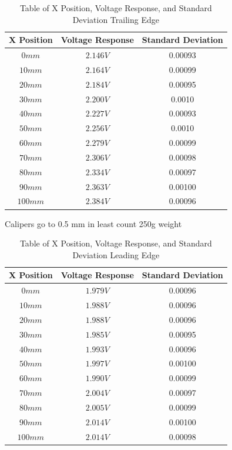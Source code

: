 \documentclass{article}
\begin{document}
\begin{table}[ht]
\centering
\begin{tabular}{|c|c|c|}
\hline
\textbf{X Position} & \textbf{Voltage Response} & \textbf{Standard Deviation} \\
\hline
$0 mm$ & $2.146 V$ & 0.00093 \\
\hline
$10 mm$ & $2.164 V$ & 0.00099\\
\hline
$20 mm$ & $2.184 V$ & 0.00095\\
\hline
$30 mm$ & $2.200 V$ & 0.0010 \\
\hline
$40 mm$ & $2.227 V$ & 0.00093 \\
\hline
$50 mm$ & $2.256 V$ & 0.0010 \\
\hline
$60 mm$ & $2.279 V$ & 0.00099 \\
\hline
$70 mm$ & $2.306 V$ & 0.00098 \\
\hline
$80 mm$ & $2.334 V$ & 0.00097\\
\hline
$90 mm$ & $2.363 V$ & 0.00100\\
\hline
$100 mm$ & $2.384 V$ & 0.00096\\
\hline
\end{tabular}
\caption{Table of X Position, Voltage Response, and Standard Deviation Trailing Edge}
\label{tab:position_voltage_stddev}
\end{table}

Calipers go to 0.5 mm in least count
250g weight



\begin{table}[ht]
\centering
\begin{tabular}{|c|c|c|}
\hline
\textbf{X Position} & \textbf{Voltage Response} & \textbf{Standard Deviation} \\
\hline
$0 mm$ & $1.979 V$ & 0.00096\\
\hline
$10 mm$ & $1.988 V$ & 0.00096 \\
\hline
$20 mm$ & $1.988 V$ & 0.00096 \\
\hline
$30 mm$ & $1.985 V$ & 0.00095 \\
\hline
$40 mm$ & $1.993 V$ & 0.00096 \\
\hline
$50 mm$ & $1.997 V$ & 0.00100 \\
\hline
$60 mm$ & $1.990 V$ & 0.00099 \\
\hline
$70 mm$ & $2.004 V$ & 0.00097 \\
\hline
$80 mm$ & $2.005 V$ & 0.00099 \\
\hline
$90 mm$ & $2.014 V$ & 0.00100 \\
\hline
$100 mm$ & $2.014 V$ & 0.00098 \\
\hline
\end{tabular}
\caption{Table of X Position, Voltage Response, and Standard Deviation Leading Edge}
\label{tab:position_voltage_stddev2}
\end{table}
\end{document}
